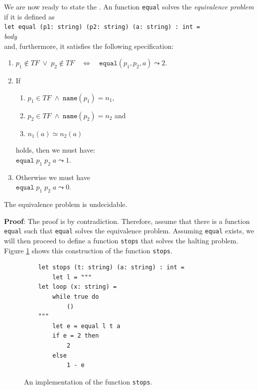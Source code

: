 \noindent
We are now ready to state the .  An \Fsharp{} function \texttt{equal} solves the
\emph{equivalence problem}  if it is defined as
\\[0.2cm]
\hspace*{1.3cm} \texttt{let equal (p1: string) (p2: string) (a: string) : int =}               \\
\hspace*{2.1cm} \textsl{body}                                \\[0.2cm]
and, furthermore, it satisfies the following specification:
\begin{enumerate}
\item $p_1 \not\in T\!F \;\vee\; p_2 \not\in T\!F \quad\Leftrightarrow\quad \mathtt{equal}(p_1, p_2, a) \leadsto 2$.
\item If 
      \begin{enumerate}
      \item $p_1 \in T\!F \;\wedge\; \mathtt{name}(p_1) = n_1$,
      \item $p_2 \in T\!F \;\wedge\; \mathtt{name}(p_2) = n_2$ \quad and
      \item $n_1(a) \simeq n_2(a)$
      \end{enumerate}
      holds, then we must have: 
      \\[0.2cm]
      \hspace*{1.3cm} 
      $\mathtt{equal}\;p_1\;p_2\;a \leadsto 1$.
\item Otherwise we must have \\[0.2cm]
      \hspace*{1.3cm} 
      $\mathtt{equal}\;p_1\;p_2\;a \leadsto 0$.
\end{enumerate}


\begin{Theorem}
The equivalence problem is undecidable.  
\end{Theorem}

\noindent
\textbf{Proof}:
The proof is by contradiction.  Therefore, assume that there is a function \texttt{equal}
such that \texttt{equal} solves the equivalence problem.  Assuming \texttt{equal} exists, we will
then proceed to define a function \texttt{stops} that solves the halting problem.
Figure \ref{fig:stops} shows this construction of the function \texttt{stops}.


\begin{figure}[!h]
  \centering
\begin{verbatim}
    let stops (t: string) (a: string) : int =
        let l = """
    let loop (x: string) =
        while true do
            ()
    """
        let e = equal l t a
        if e = 2 then
            2
        else
            1 - e
\end{verbatim}
  \vspace*{-0.3cm}
  \caption{An implementation of the function \texttt{stops}.}
  \label{fig:stops}
\end{figure}

